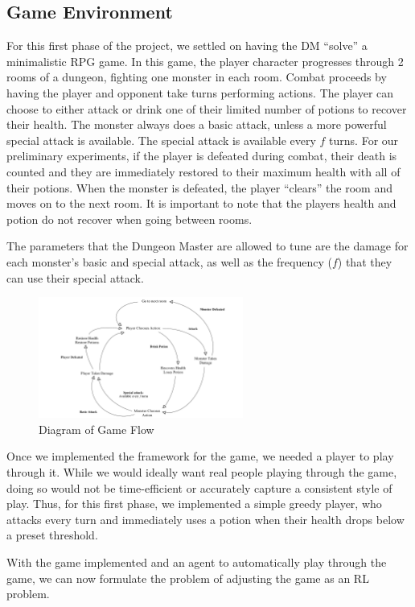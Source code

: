 \documentclass{article}
\begin{document}
\subsection{Game Environment}
For this first phase of the project, we settled on having the DM ``solve'' a minimalistic RPG game. In this game, the player character progresses through 2 rooms of a dungeon, fighting one monster in each room. Combat proceeds by having the player and opponent take turns performing actions. The player can choose to either attack or drink one of their limited number of potions to recover their health. The monster always does a basic attack, unless a more powerful special attack is available. The special attack is available every $f$ turns. For our preliminary experiments, if the player is defeated during combat, their death is counted and they are immediately restored to their maximum health with all of their potions. When the monster is defeated, the player ``clears'' the room and moves on to the next room. It is important to note that the players health and potion do not recover when going between rooms.

The parameters that the Dungeon Master are allowed to tune are the damage for each monster's basic and special attack, as well as the frequency ($f$) that they can use their special attack. 

\begin{figure}[h]
	\centering
	\includegraphics[width=0.6\textwidth]{Gameflow.png}
	\caption{Diagram of Game Flow}
\end{figure}

Once we implemented the framework for the game, we needed a player to play through it. While we would ideally want real people playing through the game, doing so would not be time-efficient or accurately capture a consistent style of play. Thus, for this first phase, we implemented a simple greedy player, who attacks every turn and immediately uses a potion when their health drops below a preset threshold. 

With the game implemented and an agent to automatically play through the game, we can now formulate the problem of adjusting the game as an RL problem.
\end{document}
